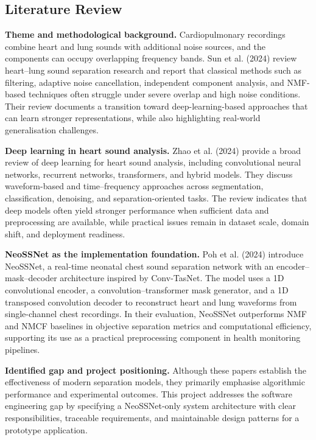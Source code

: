 \documentclass[12pt,a4paper]{report}
\begin{document}
\subsection{Literature Review}
\textbf{Theme and methodological background.} Cardiopulmonary recordings combine heart and lung sounds with additional noise sources, and the components can occupy overlapping frequency bands. Sun et al. (2024) review heart--lung sound separation research and report that classical methods such as filtering, adaptive noise cancellation, independent component analysis, and NMF-based techniques often struggle under severe overlap and high noise conditions.\citep{sun2024review} Their review documents a transition toward deep-learning-based approaches that can learn stronger representations, while also highlighting real-world generalisation challenges.\citep{sun2024review}

\noindent\textbf{Deep learning in heart sound analysis.} Zhao et al. (2024) provide a broad review of deep learning for heart sound analysis, including convolutional neural networks, recurrent networks, transformers, and hybrid models.\citep{zhao2024deep} They discuss waveform-based and time--frequency approaches across segmentation, classification, denoising, and separation-oriented tasks. The review indicates that deep models often yield stronger performance when sufficient data and preprocessing are available, while practical issues remain in dataset scale, domain shift, and deployment readiness.\citep{zhao2024deep}

\noindent\textbf{NeoSSNet as the implementation foundation.} Poh et al. (2024) introduce NeoSSNet, a real-time neonatal chest sound separation network with an encoder--mask--decoder architecture inspired by Conv-TasNet. The model uses a 1D convolutional encoder, a convolution--transformer mask generator, and a 1D transposed convolution decoder to reconstruct heart and lung waveforms from single-channel chest recordings.\citep{poh2024neossnet} In their evaluation, NeoSSNet outperforms NMF and NMCF baselines in objective separation metrics and computational efficiency, supporting its use as a practical preprocessing component in health monitoring pipelines.\citep{poh2024neossnet}

\noindent\textbf{Identified gap and project positioning.} Although these papers establish the effectiveness of modern separation models, they primarily emphasise algorithmic performance and experimental outcomes.\citep{sun2024review,zhao2024deep,poh2024neossnet} This project addresses the software engineering gap by specifying a NeoSSNet-only system architecture with clear responsibilities, traceable requirements, and maintainable design patterns for a prototype application.
\end{document}
